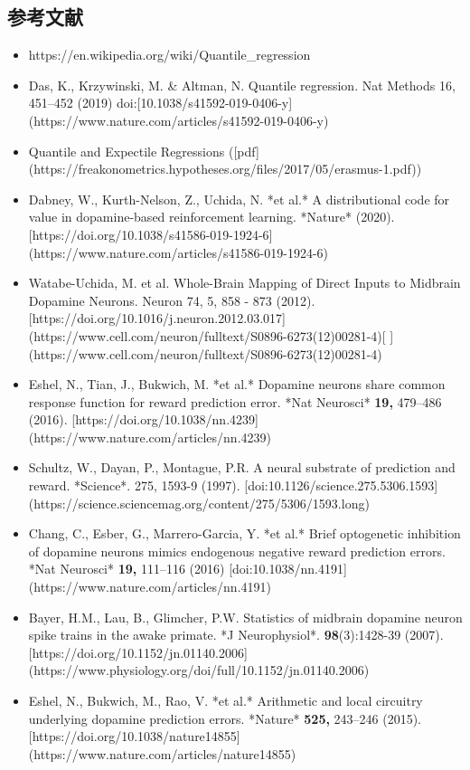 \subsection{参考文献}
\begin{itemize}
\item https://en.wikipedia.org/wiki/Quantile_regression
\item Das, K., Krzywinski, M. & Altman, N. Quantile regression. Nat Methods 16, 451–452 (2019) doi:[10.1038/s41592-019-0406-y](https://www.nature.com/articles/s41592-019-0406-y)
\item Quantile and Expectile Regressions ([pdf](https://freakonometrics.hypotheses.org/files/2017/05/erasmus-1.pdf))
\item Dabney, W., Kurth-Nelson, Z., Uchida, N. *et al.* A distributional code for value in dopamine-based reinforcement learning. *Nature* (2020). [https://doi.org/10.1038/s41586-019-1924-6](https://www.nature.com/articles/s41586-019-1924-6)
\item Watabe-Uchida, M. et al. Whole-Brain Mapping of Direct Inputs to Midbrain Dopamine Neurons. Neuron 74, 5, 858 - 873 (2012). [https://doi.org/10.1016/j.neuron.2012.03.017](https://www.cell.com/neuron/fulltext/S0896-6273(12)00281-4)[ ](https://www.cell.com/neuron/fulltext/S0896-6273(12)00281-4)
\item Eshel, N., Tian, J., Bukwich, M. *et al.* Dopamine neurons share common response function for reward prediction error. *Nat Neurosci* \textbf{19,} 479–486 (2016). [https://doi.org/10.1038/nn.4239](https://www.nature.com/articles/nn.4239)
\item Schultz, W., Dayan, P., Montague, P.R. A neural substrate of prediction and reward. *Science*. 275, 1593-9 (1997). [doi:10.1126/science.275.5306.1593](https://science.sciencemag.org/content/275/5306/1593.long)
\item Chang, C., Esber, G., Marrero-Garcia, Y. *et al.* Brief optogenetic inhibition of dopamine neurons mimics endogenous negative reward prediction errors. *Nat Neurosci* \textbf{19,} 111–116 (2016) [doi:10.1038/nn.4191](https://www.nature.com/articles/nn.4191)  
\item Bayer, H.M., Lau, B., Glimcher, P.W. Statistics of midbrain dopamine neuron spike trains in the awake primate. *J Neurophysiol*. \textbf{98}(3):1428-39 (2007). [https://doi.org/10.1152/jn.01140.2006](https://www.physiology.org/doi/full/10.1152/jn.01140.2006)
\item Eshel, N., Bukwich, M., Rao, V. *et al.* Arithmetic and local circuitry underlying dopamine prediction errors. *Nature* \textbf{525,} 243–246 (2015). [https://doi.org/10.1038/nature14855](https://www.nature.com/articles/nature14855)
\end{itemize}
